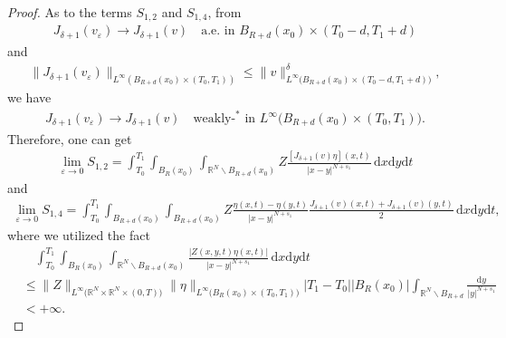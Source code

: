 \documentclass[10pt,a4paper]{amsart}
\begin{document}
\begin{proof}
	As to the terms $S_{1,2}$ and $S_{1,4}$, from
	\begin{align*}
		J_{\delta+1}(v_\varepsilon)\rightarrow J_{\delta+1}(v)\quad\text{a.e. in }B_{R+d}(x_0)\times(T_0-d,T_1+d)
	\end{align*}
	and
	\begin{align*}
		\|J_{\delta+1}(v_\varepsilon)\|_{L^\infty\left( B_{R+d}(x_0)\times(T_0,T_1)\right) }\le\|v\|^\delta_{L^\infty\bigl( B_{R+d}(x_0)\times(T_0-d,T_1+d)\bigl) },
	\end{align*}
	we have
	\begin{align}
		\label{1.61}
		J_{\delta+1}(v_\varepsilon)\rightarrow J_{\delta+1}(v)\quad\text{weakly-}^*\text{ in }L^\infty\bigl( B_{R+d}(x_0)\times(T_0,T_1)\bigl). 
	\end{align}
	Therefore, one can get
	\begin{align*}
		\lim\limits_{\varepsilon\rightarrow0}S_{1,2}=\int_{T_0}^{T_1}\int_{B_R(x_0)}\int_{\mathbb{R}^N\backslash B_{R+d}(x_0)}Z\frac{\left[ J_{\delta+1}(v)\eta\right](x,t)}{|x-y|^{N+s_1}}\,\mathrm{d}x\mathrm{d}y\mathrm{d}t
	\end{align*}
	and
	\begin{align*}
		\lim\limits_{\varepsilon\rightarrow0}S_{1,4}=\int_{T_0}^{T_1}\int_{B_{R+d}(x_0)}\int_{B_{R+d}(x_0)}Z\frac{\eta(x,t)-\eta(y,t)}{|x-y|^{N+s_1}}\frac{J_{\delta+1}(v)(x,t)+J_{\delta+1}(v)(y,t)}{2}\,\mathrm{d}x\mathrm{d}y\mathrm{d}t,
	\end{align*}
	where we utilized the fact
	\begin{align*}
		&\quad\int_{T_0}^{T_1}\int_{B_R(x_0)}\int_{\mathbb{R}^N\backslash B_{R+d}(x_0)}\frac{|Z(x,y,t)\eta(x,t)|}{|x-y|^{N+s_1}}\,\mathrm{d}x\mathrm{d}y\mathrm{d}t\\
		&\le \|Z\|_{L^\infty\bigl(\mathbb{R}^N\times\mathbb{R}^N\times(0,T)\bigl)}\|\eta\|_{L^\infty\bigl(B_R(x_0)\times(T_0,T_1)\bigl)}|T_1-T_0||B_R(x_0)|\int_{\mathbb{R}^N\backslash B_{R+d}}\frac{\mathrm{d}y}{|y|^{N+s_1}}\\
		&<+\infty.
	\end{align*}
	

\end{proof}
\end{document}
